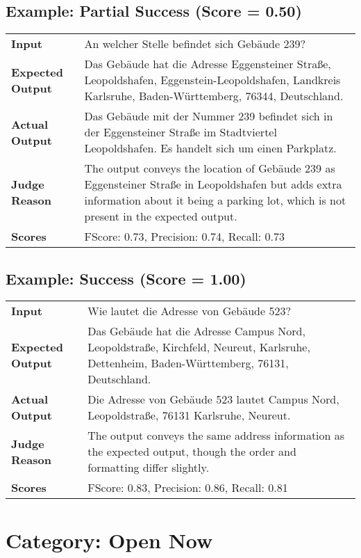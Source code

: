 \documentclass{article}
\begin{document}
\subsection*{Example: Partial Success (Score = 0.50)}
\begin{longtable}{p{} p{}}
\textbf{Input} & An welcher Stelle befindet sich Gebäude 239? \\
\textbf{Expected Output} & Das Gebäude hat die Adresse Eggensteiner Straße, Leopoldshafen, Eggenstein-Leopoldshafen, Landkreis Karlsruhe, Baden-Württemberg, 76344, Deutschland. \\
\textbf{Actual Output} & Das Gebäude mit der Nummer 239 befindet sich in der Eggensteiner Straße im Stadtviertel Leopoldshafen. Es handelt sich um einen Parkplatz. \\
\textbf{Judge Reason} & The output conveys the location of Gebäude 239 as Eggensteiner Straße in Leopoldshafen but adds extra information about it being a parking lot, which is not present in the expected output. \\
\textbf{Scores} & FScore: 0.73, Precision: 0.74, Recall: 0.73 \\
\end{longtable}
\subsection*{Example: Success (Score = 1.00)}
\begin{longtable}{p{} p{}}
\textbf{Input} & Wie lautet die Adresse von Gebäude 523? \\
\textbf{Expected Output} & Das Gebäude hat die Adresse Campus Nord, Leopoldstraße, Kirchfeld, Neureut, Karlsruhe, Dettenheim, Baden-Württemberg, 76131, Deutschland. \\
\textbf{Actual Output} & Die Adresse von Gebäude 523 lautet Campus Nord, Leopoldstraße, 76131 Karlsruhe, Neureut. \\
\textbf{Judge Reason} & The output conveys the same address information as the expected output, though the order and formatting differ slightly. \\
\textbf{Scores} & FScore: 0.83, Precision: 0.86, Recall: 0.81 \\
\end{longtable}
\section*{Category: Open Now}
\end{document}
